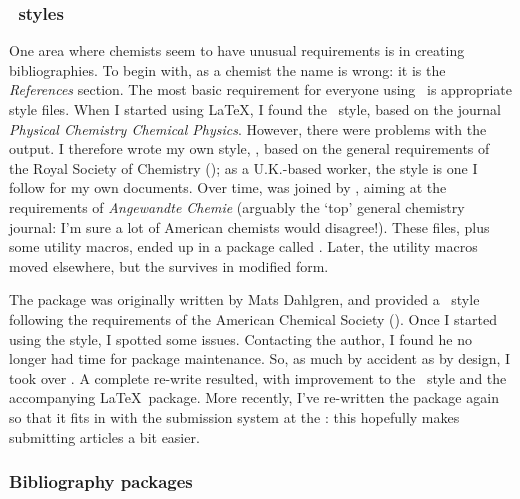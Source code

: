 \begin{bibunit}
\subsubsection{\BibTeX\ styles}

One area where chemists seem to have unusual requirements is in
creating bibliographies.  To begin with, as a chemist the name
is wrong: it is the \emph{References} section.  The most basic
requirement for everyone using \BibTeX\ is appropriate style
files.  When I started using \LaTeX, I found the
 \BibTeX\ style, based on the journal
\emph{Physical Chemistry Chemical Physics}.  However, there
were problems with the output.  I therefore wrote my own style,
, based on the general requirements of the Royal
Society of Chemistry (); as a U.K.-based worker, the
 style is one I follow for my own documents.  Over
time,  was joined by , aiming at
the requirements of \emph{Angewandte Chemie} (arguably the
`top' general chemistry journal: I'm sure a lot of American
chemists would disagree!). These files, plus some utility
macros, ended up in a package called . Later, the
utility macros moved elsewhere, but the  survives in
modified form.

The  package was originally written by Mats
Dahlgren, and provided a \BibTeX\ style following the
requirements of the American Chemical Society ().
Once I started using the style, I spotted some issues.
Contacting the author, I found he no longer had time for
package maintenance.  So, as much by accident as by design, I
took over .  A complete re-write resulted, with
improvement to the \BibTeX\ style and the accompanying \LaTeX\
package. More recently, I've re-written the package again so that
it fits in with the submission system at the \acro{ACS}: this
hopefully makes submitting articles a bit easier. 

\subsubsection{Bibliography packages}


\end{bibunit}
